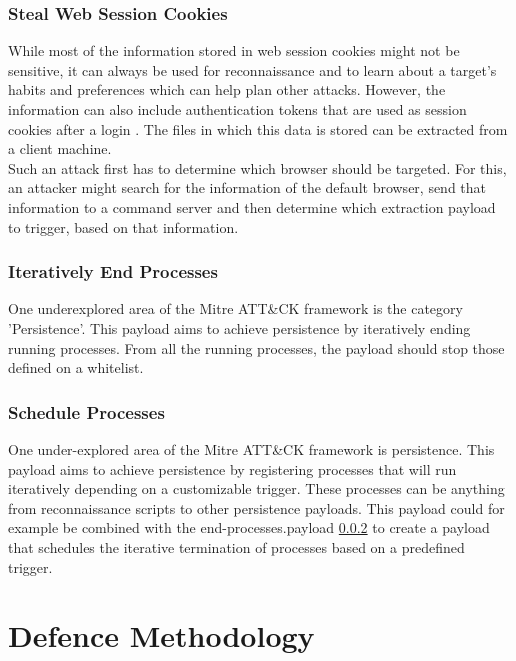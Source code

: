 \subsubsection{Steal Web Session Cookies}

While most of the information stored in web session cookies might not be sensitive, it can always be used for reconnaissance and to learn about a target's habits and preferences which can help plan other attacks. However, the information can also include authentication tokens that are used as session cookies after a login \cite{StealWebSession}. The files in which this data is stored can be extracted from a client machine. \\
Such an attack first has to determine which browser should be targeted. For this, an attacker might search for the information of the default browser, send that information to a command server and then determine which extraction payload to trigger, based on that information. 


\subsubsection{Iteratively End Processes} \label{Iteratively End Processes}

One underexplored area of the Mitre ATT\&CK framework is the category 'Persistence'. This payload aims to achieve persistence by iteratively ending running processes. From all the running processes, the payload should stop those defined on a whitelist.


\subsubsection{Schedule Processes}

One under-explored area of the Mitre ATT\&CK framework is persistence. This payload aims to achieve persistence by registering processes that will run iteratively depending on a customizable trigger. These processes can be anything from reconnaissance scripts to other persistence payloads. This payload could for example be combined with the end-processes.payload \ref{Iteratively End Processes} to create a payload that schedules the iterative termination of processes based on a predefined trigger.



\section{Defence Methodology} \label{Defence Methodology}


